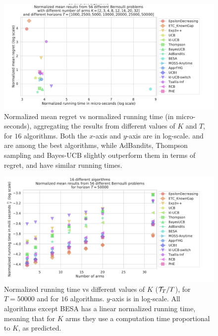 \begin{figure}[h!]  %
	\includegraphics[width=1.10\linewidth]{16_different_algorithms__lognormregret_vs_lognormtime__56pb__7Ks_7Ts.pdf}
	\caption[Normalized mean regret vs normalized running time (in micro-seconds).]{
        Normalized mean regret vs normalized running time (in micro-seconds),
        aggregating the results from different values of $K$ and $T$, for $16$ algorithms.
        Both the $x$-axis and $y$-axis are in log-scale.
        \UCB{} and \klUCB{} are among the best algorithms, while AdBandits, Thompson sampling and Bayes-UCB slightly outperform them in terms of regret, and have similar running times.
	}
	\label{fig:3:16_different_algorithms__lognormregret_vs_lognormtime__56pb__7Ks_7Ts}
\end{figure}


\begin{figure}[h!]  %
	\includegraphics[width=1.10\linewidth]{16_different_algorithms__lognormtime_vs_arms__56pb__7Ks_T50000.pdf}
	\caption[Normalized running time vs different values of $K$.]{
        Normalized running time vs different values of $K$ ($\mathcal{T}_T / T$),
        for $T=50000$ and for $16$ algorithms.
        $y$-axis is in log-scale.
        All algorithms except BESA has a linear normalized running time, meaning that for $K$ arms they use a computation time proportional to $K$, as predicted.
	}
	\label{fig:3:16_different_algorithms__lognormtime_vs_arms__56pb__7Ks_T50000}
\end{figure}


